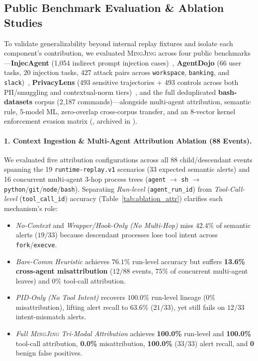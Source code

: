 \documentclass[10pt,twocolumn,letterpaper]{article}
\newcommand{\sys}{\textsc{MingJing}}
\newcommand{\code}[1]{\texttt{\small #1}}
\begin{document}
\subsection{Public Benchmark Evaluation \& Ablation Studies}
\label{sec:ablation}
To validate generalizability beyond internal replay fixtures and isolate each component's contribution, we evaluated \sys{} across four public benchmarks---\textbf{InjecAgent} (1,054 indirect prompt injection cases)~\cite{injecagent2024}, \textbf{AgentDojo} (66 user tasks, 20 injection tasks, 427 attack pairs across \code{workspace}, \code{banking}, and \code{slack})~\cite{agentdojo2024}, \textbf{PrivacyLens} (493 sensitive trajectories + 493 controls across both PII/smuggling and contextual-norm tiers)~\cite{privacylens2024}, and the full deduplicated \textbf{bash-datasets} corpus (2,187 commands)---alongside multi-agent attribution, semantic rule, 5-model ML, zero-overlap cross-corpus transfer, and an 8-vector kernel enforcement evasion matrix (, archived in ).

\paragraph{1. Context Ingestion \& Multi-Agent Attribution Ablation (88 Events).}
We evaluated five attribution configurations across all 88 child/descendant events spanning the 19 \code{runtime-replay.v1} scenarios (33 expected semantic alerts) and 16 concurrent multi-agent 3-hop process trees (\code{agent} $\to$ \code{sh} $\to$ \code{python}/\code{git}/\code{node}/\code{bash}). Separating \emph{Run-level} (\code{agent\_run\_id}) from \emph{Tool-Call-level} (\code{tool\_call\_id}) accuracy (Table~\ref{tab:ablation_attr}) clarifies each mechanism's role:
\begin{itemize}
  \item \emph{No-Context} and \emph{Wrapper/Hook-Only (No Multi-Hop)} miss $42.4\%$ of semantic alerts ($19/33$) because descendant processes lose tool intent across \code{fork}/\code{execve}.
  \item \emph{Bare-Comm Heuristic} achieves $76.1\%$ run-level accuracy but suffers \textbf{13.6\% cross-agent misattribution} ($12/88$ events, $75\%$ of concurrent multi-agent leaves) and $0\%$ tool-call attribution.
  \item \emph{PID-Only (No Tool Intent)} recovers $100.0\%$ run-level lineage ($0\%$ misattribution), lifting alert recall to $63.6\%$ ($21/33$), yet still fails on $12/33$ intent-mismatch alerts.
  \item \emph{Full \sys{} Tri-Modal Attribution} achieves \textbf{100.0\%} run-level and \textbf{100.0\%} tool-call attribution, \textbf{0.0\%} misattribution, \textbf{100.0\%} ($33/33$) alert recall, and \textbf{0} benign false positives.
\end{itemize}
\end{document}

